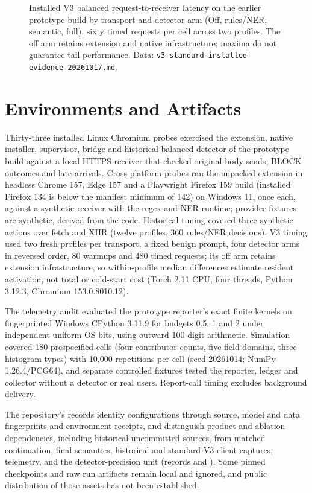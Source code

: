 \documentclass[sigconf]{acmart}
\theoremstyle{acmdefinition}\newtheorem{property}{Property}
\begin{document}
\begin{figure}[!t]
\centering

\caption{Installed V3 balanced request-to-receiver latency on the earlier prototype build by transport and detector arm (Off, rules/NER, semantic, full), sixty timed requests per cell across two profiles. The off arm retains extension and native infrastructure; maxima do not guarantee tail performance. Data: \texttt{v3-standard-installed-evidence-20261017.md}.}
\label{fig:latency}
\end{figure}

\section{Environments and Artifacts}
\label{app:environments}
Thirty-three installed Linux Chromium probes exercised the extension, native installer, supervisor, bridge and historical balanced detector of the prototype build against a local HTTPS receiver that checked original-body sends, BLOCK outcomes and late arrivals. Cross-platform probes ran the unpacked extension in headless Chrome 157, Edge 157 and a Playwright Firefox 159 build (installed Firefox 134 is below the manifest minimum of 142) on Windows 11, once each, against a synthetic receiver with the regex and NER runtime; provider fixtures are synthetic, derived from the code. Historical timing covered three synthetic actions over fetch and XHR (twelve profiles, 360 rules/NER decisions). V3 timing used two fresh profiles per transport, a fixed benign prompt, four detector arms in reversed order, 80 warmups and 480 timed requests; its off arm retains extension infrastructure, so within-profile median differences estimate resident activation, not total or cold-start cost (Torch 2.11 CPU, four threads, Python 3.12.3, Chromium 153.0.8010.12).

The telemetry audit evaluated the prototype reporter's exact finite kernels on fingerprinted Windows CPython 3.11.9 for budgets 0.5, 1 and 2 under independent uniform OS bits, using outward 100-digit arithmetic. Simulation covered 180 prespecified cells (four contributor counts, five field domains, three histogram types) with 10,000 repetitions per cell (seed 20261014; NumPy 1.26.4/PCG64), and separate controlled fixtures tested the reporter, ledger and collector without a detector or real users. Report-call timing excludes background delivery.

The repository's records identify configurations through source, model and data fingerprints and environment receipts, and distinguish product and ablation dependencies, including historical uncommitted sources, from matched continuation, final semantics, historical and standard-V3 client captures, telemetry, and the detector-precision unit (records  and ). Some pinned checkpoints and raw run artifacts remain local and ignored, and public distribution of those assets has not been established.
\end{document}
